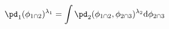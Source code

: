 \begin{equation}
  \pd_{1}(\phi_{1 \cap 2})^{\lambda_{1}} = \int \pd_{2}(\phi_{1 \cap 2}, \phi_{2 \cap 3})^{\lambda_{2}} \text{d}\phi_{2 \cap 3}
  \label{eqn:marginal-pooling-weights}
\end{equation}
